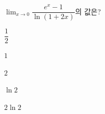 $\displaystyle\lim_{x\to 0}\dfrac{e^x-1}{\ln(1+2x)}$의 값은?
\begin{choices32}{\rule[-3ex]{0pt}{8ex}$\dfrac{1}{2}$}{\rule[-3ex]{0pt}{8ex}$1$}{\rule[-3ex]{0pt}{8ex}$2$}{\rule[-3ex]{0pt}{8ex}$\ln 2$}{\rule[-3ex]{0pt}{8ex}$2\ln 2$}\end{choices32}
